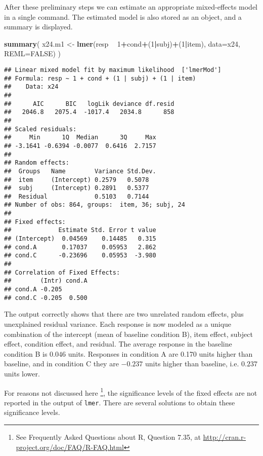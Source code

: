 \documentclass[]{book}
\newenvironment{Shaded}{\begin{snugshade}}{\end{snugshade}}
\newcommand{\DataTypeTok}[1]{\textcolor[rgb]{0.13,0.29,0.53}{#1}}
\newcommand{\DecValTok}[1]{\textcolor[rgb]{0.00,0.00,0.81}{#1}}
\newcommand{\KeywordTok}[1]{\textcolor[rgb]{0.13,0.29,0.53}{\textbf{#1}}}
\newcommand{\NormalTok}[1]{#1}
\newcommand{\OperatorTok}[1]{\textcolor[rgb]{0.81,0.36,0.00}{\textbf{#1}}}
\newcommand{\OtherTok}[1]{\textcolor[rgb]{0.56,0.35,0.01}{#1}}
\newcommand{\StringTok}[1]{\textcolor[rgb]{0.31,0.60,0.02}{#1}}
\begin{document}
After these preliminary steps we can estimate an appropriate mixed-effects
model in a single command. The estimated model is also stored as an
object, and a summary is displayed.

\begin{Shaded}
\begin{Highlighting}[]
\KeywordTok{summary}\NormalTok{( x24.m1 <-}\StringTok{ }\KeywordTok{lmer}\NormalTok{(resp }\OperatorTok{~}\StringTok{ }\DecValTok{1}\OperatorTok{+}\NormalTok{cond}\OperatorTok{+}\NormalTok{(}\DecValTok{1}\OperatorTok{|}\NormalTok{subj)}\OperatorTok{+}\NormalTok{(}\DecValTok{1}\OperatorTok{|}\NormalTok{item),}
                        \DataTypeTok{data=}\NormalTok{x24, }\DataTypeTok{REML=}\OtherTok{FALSE}\NormalTok{) )}
\end{Highlighting}
\end{Shaded}

\begin{verbatim}
## Linear mixed model fit by maximum likelihood  ['lmerMod']
## Formula: resp ~ 1 + cond + (1 | subj) + (1 | item)
##    Data: x24
## 
##      AIC      BIC   logLik deviance df.resid 
##   2046.8   2075.4  -1017.4   2034.8      858 
## 
## Scaled residuals: 
##     Min      1Q  Median      3Q     Max 
## -3.1641 -0.6394 -0.0077  0.6416  2.7157 
## 
## Random effects:
##  Groups   Name        Variance Std.Dev.
##  item     (Intercept) 0.2579   0.5078  
##  subj     (Intercept) 0.2891   0.5377  
##  Residual             0.5103   0.7144  
## Number of obs: 864, groups:  item, 36; subj, 24
## 
## Fixed effects:
##             Estimate Std. Error t value
## (Intercept)  0.04569    0.14485   0.315
## cond.A       0.17037    0.05953   2.862
## cond.C      -0.23696    0.05953  -3.980
## 
## Correlation of Fixed Effects:
##        (Intr) cond.A
## cond.A -0.205       
## cond.C -0.205  0.500
\end{verbatim}

The output correctly shows that there are two unrelated random effects,
plus unexplained residual variance. Each response is now modeled as a
unique combination of the intercept (mean of baseline condition B), item
effect, subject effect, condition effect, and residual. The average
response in the baseline condition B is \(0.046\) units. Responses in
condition A are 0.170 units higher than baseline, and in condition C
they are \(-0.237\) units higher than baseline, i.e. \(0.237\) units lower.

For reasons not discussed here \footnote{See Frequently Asked Questions about R, Question
  7.35, at \url{http://cran.r-project.org/doc/FAQ/R-FAQ.html}}, the significance levels of the
fixed effects are not reported in the output of
\texttt{lmer}. There are several solutions to obtain
these significance levels.
\end{document}
